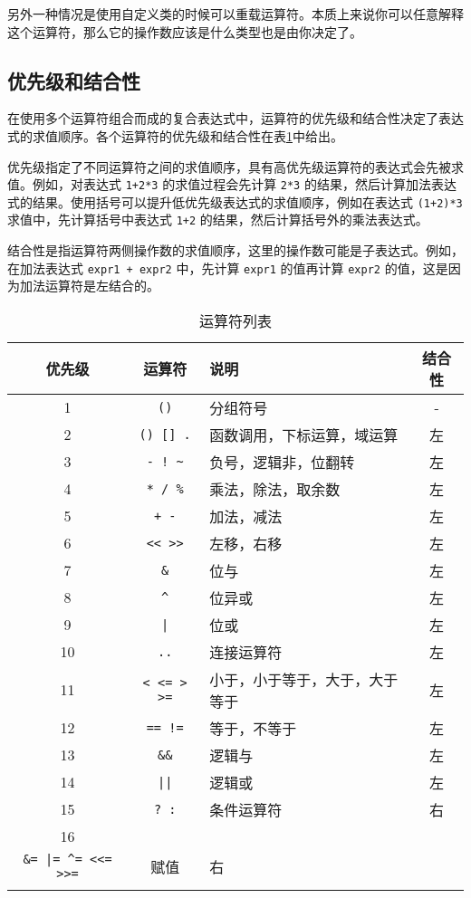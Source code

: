另外一种情况是使用自定义类的时候可以重载运算符。本质上来说你可以任意解释这个运算符，那么它的操作数应该是什么类型也是由你决定了。

\subsection{优先级和结合性}

在使用多个运算符组合而成的复合表达式中，运算符的优先级和结合性决定了表达式的求值顺序。各个运算符的优先级和结合性在表\ref{tab::operator_list}中给出。

优先级指定了不同运算符之间的求值顺序，具有高优先级运算符的表达式会先被求值。例如，对表达式 \texttt{1+2*3} 的求值过程会先计算 \texttt{2*3} 的结果，然后计算加法表达式的结果。使用括号可以提升低优先级表达式的求值顺序，例如在表达式 \texttt{(1+2)*3} 求值中，先计算括号中表达式 \texttt{1+2} 的结果，然后计算括号外的乘法表达式。

结合性是指运算符两侧操作数的求值顺序，这里的操作数可能是子表达式。例如，在加法表达式 \texttt{expr1 + expr2} 中，先计算 \texttt{expr1} 的值再计算 \texttt{expr2} 的值，这是因为加法运算符是左结合的。

\begin{table}[htb]
    \centering
    \setlength{\tabcolsep}{3mm}
    \begin{tabular}{cclc} \Xhline{1pt}
        \textbf{优先级} & \textbf{运算符} & \textbf{说明} & \textbf{结合性} \\ \hline
        1 & \texttt{()} & 分组符号 & - \\
        2 & \texttt{() [] .} & 函数调用，下标运算，域运算 & 左 \\
        3 & \texttt{- ! \textasciitilde} & 负号，逻辑非，位翻转 & 左 \\
        4 & \texttt{* / \%} & 乘法，除法，取余数 & 左 \\
        5 & \texttt{+ -} & 加法，减法 & 左 \\
        6 & \texttt{<< >>} & 左移，右移 & 左 \\
        7 & \texttt{\&} & 位与 & 左 \\
        8 & \texttt{\textasciicircum} & 位异或 & 左 \\
        9 & \texttt{|} & 位或 & 左 \\
        10 & \texttt{..} & 连接运算符 & 左 \\
        11 & \texttt{< <= > >=} & 小于，小于等于，大于，大于等于 & 左 \\
        12 & \texttt{== !=} & 等于，不等于 & 左 \\
        13 & \texttt{\&\&} & 逻辑与 & 左 \\
        14 & \texttt{||} & 逻辑或 & 左 \\
        15 & \texttt{? :} & 条件运算符 & 右 \\
        16 & \makecell{\texttt{= += -= *= /= \%=} \\
                       \texttt{\&= |= \textasciicircum= <<= >>=}} & 赋值 & 右 \\
        \Xhline{1pt}
    \end{tabular}
    \caption{运算符列表}
    \label{tab::operator_list}
\end{table}

